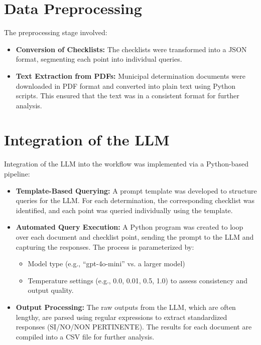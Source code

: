 \documentclass[../main.tex]{subfiles}
\begin{document}
\section*{Data Preprocessing}
The preprocessing stage involved:

\begin{itemize}
    \item \textbf{Conversion of Checklists:}
 The checklists were transformed into a JSON format, segmenting each point into individual queries.
    \item \textbf{Text Extraction from PDFs:}
 Municipal determination documents were downloaded in PDF format and converted into plain text using Python scripts. This ensured that the text was in a consistent format for further analysis.
\end{itemize}
 

\section*{Integration of the LLM}
Integration of the LLM into the workflow was implemented via a Python-based pipeline:

\begin{itemize}
    \item \textbf{Template-Based Querying:}
 A prompt template was developed to structure queries for the LLM. For each determination, the corresponding checklist was identified, and each point was queried individually using the template.
    \item \textbf{Automated Query Execution:}
 A Python program was created to loop over each document and checklist point, sending the prompt to the LLM and capturing the responses. The process is parameterized by:
    \begin{itemize}
        \item Model type (e.g., “gpt-4o-mini” vs. a larger model)
        \item Temperature settings (e.g., 0.0, 0.01, 0.5, 1.0) to assess consistency and output quality.
    \end{itemize}
    \item \textbf{Output Processing:}
 The raw outputs from the LLM, which are often lengthy, are parsed using regular expressions to extract standardized responses (SI/NO/NON PERTINENTE). The results for each document are compiled into a CSV file for further analysis.
\end{itemize}
\end{document}
